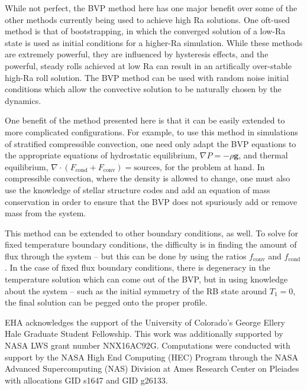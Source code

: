 \documentclass[aps, pre, onecolumn, nofootinbib, notitlepage, groupedaddress, amsfonts, amssymb, amsmath, longbibliography]{revtex4-1}
\newcommand{\Div}[1]{\ensuremath{\nabla\cdot\left( #1\right)}}
\newcommand{\grad}{\ensuremath{\nabla}}
\begin{document}
While not perfect, the BVP method here has one major benefit over some of the other methods
currently being used to achieve high Ra solutions.  One oft-used method is that of bootstrapping,
in which the converged solution of a low-Ra state is used as initial conditions for a higher-Ra
simulation.  While these methods are extremely powerful, they are influenced by hysteresis effects,
and the powerful, steady rolls achieved at low Ra can result in an artifically over-stable high-Ra
roll solution.  The BVP method can be used with random noise initial conditions which allow the
convective solution to be naturally chosen by the dynamics.

One benefit of the method presented here is that it can be easily extended to more complicated
configurations.  For example, to use this method in simulations of stratified compressible convection,
one need only adapt the BVP equations to the appropriate equations of hydrostatic equilibrium,
$\grad P = -\rho \bm{g}$, and thermal equilibrium, $\Div{F_{\text{cond}} + F_{\text{conv}}} = \text{sources}$,
for the problem at hand.  In compressible convection, where the density is allowed to change,
one must also use the knowledge of stellar structure codes and add an equation of mass conservation
in order to ensure that the BVP does not spuriously add or remove mass from the system.

This method can be extended to other boundary conditions, as well.  To solve for fixed temperature
boundary conditions, the difficulty is in finding the amount of flux through the system -- but
this can be done by using the ratios $f_{\text{conv}}$ and $f_{\text{cond}}$.  In the case of
fixed flux boundary conditions, there is degeneracy in the temperature solution which can come
out of the BVP, but in using knowledge about the system -- such as the initial symmetry of the
RB state around $T_1 = 0$, the final solution can be pegged onto the proper profile.




\begin{acknowledgments}
EHA acknowledges the support of the University of Colorado's George 
Ellery Hale Graduate Student Fellowship.
This work was additionally supported by  NASA LWS grant number NNX16AC92G.  
Computations were conducted 
with support by the NASA High End Computing (HEC) Program through the NASA 
Advanced Supercomputing (NAS) Division at Ames Research Center on Pleiades
with allocations GID s1647 and GID g26133.
\end{acknowledgments}
\end{document}
